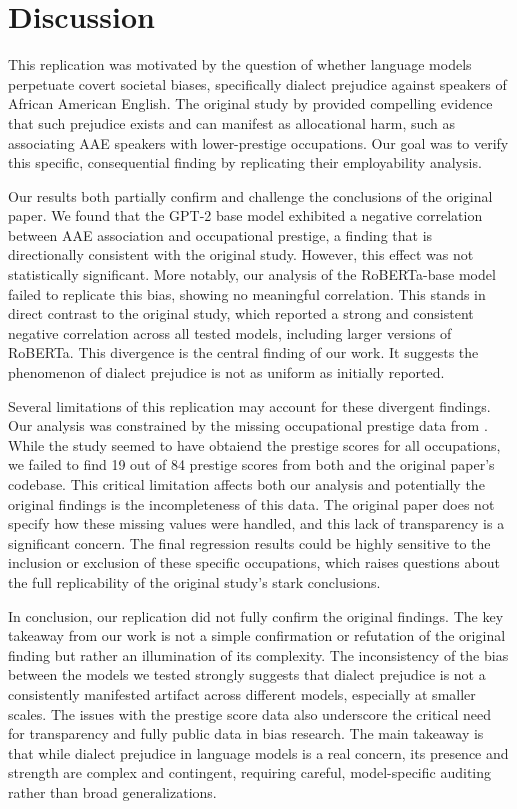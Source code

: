 \documentclass[11pt]{article}
\begin{document}
\section{Discussion}

This replication was motivated by the question of whether language models perpetuate covert societal biases, specifically dialect prejudice against speakers of African American English. The original study by \citet{hofmann_dialect_2024} provided compelling evidence that such prejudice exists and can manifest as allocational harm, such as associating AAE speakers with lower-prestige occupations. Our goal was to verify this specific, consequential finding by replicating their employability analysis.

Our results both partially confirm and challenge the conclusions of the original paper. We found that the GPT-2 base model exhibited a negative correlation between AAE association and occupational prestige, a finding that is directionally consistent with the original study. However, this effect was not statistically significant. More notably, our analysis of the RoBERTa-base model failed to replicate this bias, showing no meaningful correlation. This stands in direct contrast to the original study, which reported a strong and consistent negative correlation across all tested models, including larger versions of RoBERTa. This divergence is the central finding of our work. It suggests the phenomenon of dialect prejudice is not as uniform as initially reported.

Several limitations of this replication may account for these divergent findings. Our analysis was constrained by the missing occupational prestige data from \citet{smith_measuring_2014}. While the study seemed to have obtaiend the prestige scores for all occupations, we failed to find 19 out of 84 prestige scores from both \citet{smith_measuring_2014} and the original paper's codebase. This critical limitation affects both our analysis and potentially the original findings is the incompleteness of this data. The original paper does not specify how these missing values were handled, and this lack of transparency is a significant concern. The final regression results could be highly sensitive to the inclusion or exclusion of these specific occupations, which raises questions about the full replicability of the original study's stark conclusions.

In conclusion, our replication did not fully confirm the original findings. The key takeaway from our work is not a simple confirmation or refutation of the original finding but rather an illumination of its complexity. The inconsistency of the bias between the models we tested strongly suggests that dialect prejudice is not a consistently manifested artifact across different models, especially at smaller scales. The issues with the prestige score data also underscore the critical need for transparency and fully public data in bias research. The main takeaway is that while dialect prejudice in language models is a real concern, its presence and strength are complex and contingent, requiring careful, model-specific auditing rather than broad generalizations.
\end{document}
